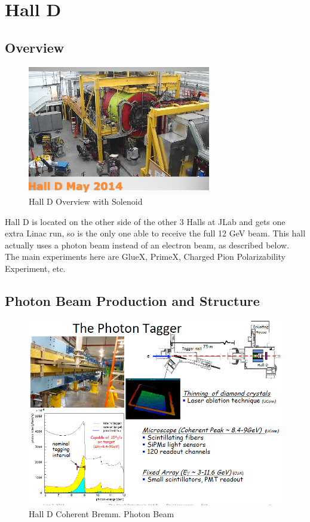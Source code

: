     \section{Hall D}
        \subsection{Overview}
            \begin{figure}[H]
                \centering
                \includegraphics[width=8cm]{CLAS-12/modules/jlab/Other_Halls/HallD/Hall_Design/Hall_D.PNG}
                \caption{Hall D Overview with Solenoid}
            \end{figure}
            
            Hall D is located on the other side of the other 3 Halls at JLab and gets one extra Linac run, so is the only one able to receive the full 12 GeV beam. This hall actually uses a photon beam instead of an electron beam, as described below. The main experiments here are GlueX, PrimeX, Charged Pion Polarizability Experiment, etc.
            
        \subsection{Photon Beam Production and Structure}
            \begin{figure}[H]
                \centering
                \includegraphics[width=14cm]{CLAS-12/modules/jlab/Other_Halls/HallD/Hall_Design/hall_D_Photon_tagger.PNG}
                \caption{Hall D Coherent Bremm. Photon Beam}
            \end{figure}
            
